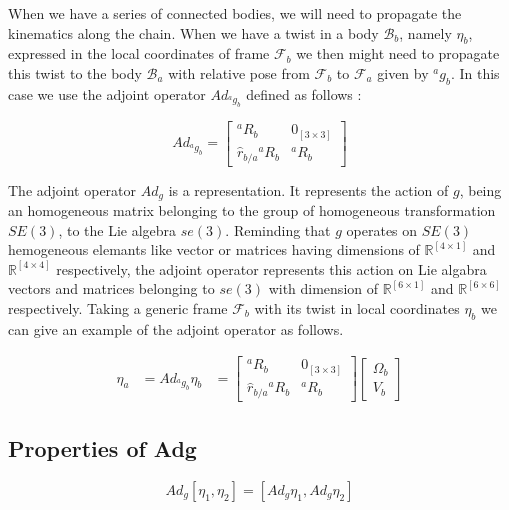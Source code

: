 \documentclass[12pt,a4paper]{book}
\newcommand{\Fa}{\ensuremath{\mathcal{F}_a}}
\newcommand{\Fb}{\ensuremath{\mathcal{F}_b}}
\newcommand{\Ba}{\ensuremath{\mathcal{B}_a}}
\newcommand{\Bb}{\ensuremath{\mathcal{B}_b}}
\newcommand{\agb}{\ensuremath{{^a g _b}}}
\newcommand{\aRb}{\ensuremath{{^a R _b}}}
\newcommand{\hatrba}{\ensuremath{{\hat{r}_{b/a}}}}
\newcommand{\etaa}{\ensuremath{{\eta_{a}}}}
\newcommand{\etab}{\ensuremath{{\eta_{b}}}}
\newcommand{\Adagb}{\ensuremath{Ad_{\agb}}}
\begin{document}
When we have a series of connected bodies, we will need to propagate the kinematics along the chain. When we have a twist in a body \Bb{}, namely \etab{}, expressed in the local coordinates of frame \Fb{} we then might need to propagate this twist to the body \Ba{} with relative pose from \Fb{} to \Fa{} given by \agb{}. In this case we use the adjoint operator \Adagb{} defined as follows :


\begin{equation}
	\Adagb = 
	\begin{bmatrix}
		\aRb	&	0_{[3\times 3]}	\\
		\hatrba \aRb	&	\aRb
	\end{bmatrix}
\end{equation}


The adjoint operator $Ad_g$ is a representation. It represents the action of $g$, being an homogeneous matrix belonging to the group of homogeneous transformation $SE(3)$, to the Lie algebra $se(3)$. Reminding that $g$ operates on $SE(3)$ hemogeneous elemants like vector or matrices having dimensions of $\mathbb{R}^{[4 \times 1]}$ and $\mathbb{R}^{[4 \times 4]}$ respectively, the adjoint operator represents this action on Lie algabra vectors and matrices belonging to $se(3)$ with dimension of $\mathbb{R}^{[6 \times 1]}$ and $\mathbb{R}^{[6 \times 6]}$ respectively.
Taking a generic frame \Fb{} with its twist in local coordinates $\etab$ we can give an example of the adjoint operator as follows.

\begin{equation}
\begin{aligned}
	\etaa 	&= \Adagb \etab
			&=
			\begin{bmatrix}
				\aRb	&	0_{[3\times 3]}	\\
				\hatrba \aRb	&	\aRb
			\end{bmatrix}
			\begin{bmatrix}
				\Omega_b	\\
				V_b
			\end{bmatrix}
\end{aligned}
\end{equation}

\subsection{Properties of Adg}

\begin{equation}
	Ad_g \left[\eta_1, \eta_2 \right] =  \left[Ad_g \eta_1, Ad_g \eta_2 \right]
\end{equation}
\end{document}
